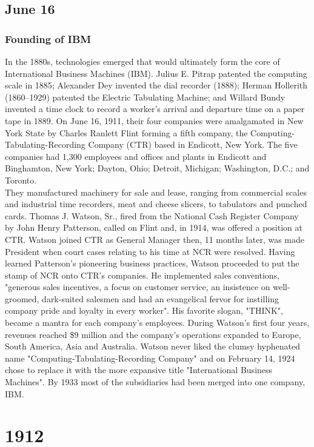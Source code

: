 \documentclass[11pt]{report}
\begin{document}
\section{June 16}
\subsection{Founding of IBM}
In the 1880s, technologies emerged that would ultimately form the core of International Business Machines (IBM). Julius E. Pitrap patented the computing scale in 1885; Alexander Dey invented the dial recorder (1888); Herman Hollerith (1860–1929) patented the Electric Tabulating Machine; and Willard Bundy invented a time clock to record a worker's arrival and departure time on a paper tape in 1889. On June 16, 1911, their four companies were amalgamated in New York State by Charles Ranlett Flint forming a fifth company, the Computing-Tabulating-Recording Company (CTR) based in Endicott, New York. The five companies had 1,300 employees and offices and plants in Endicott and Binghamton, New York; Dayton, Ohio; Detroit, Michigan; Washington, D.C.; and Toronto.\\ \indent They manufactured machinery for sale and lease, ranging from commercial scales and industrial time recorders, meat and cheese slicers, to tabulators and punched cards. Thomas J. Watson, Sr., fired from the National Cash Register Company by John Henry Patterson, called on Flint and, in 1914, was offered a position at CTR. Watson joined CTR as General Manager then, 11 months later, was made President when court cases relating to his time at NCR were resolved. Having learned Patterson's pioneering business practices, Watson proceeded to put the stamp of NCR onto CTR's companies. He implemented sales conventions, "generous sales incentives, a focus on customer service, an insistence on well-groomed, dark-suited salesmen and had an evangelical fervor for instilling company pride and loyalty in every worker". His favorite slogan, "THINK", became a mantra for each company's employees. During Watson's first four years, revenues reached \$9 million and the company's operations expanded to Europe, South America, Asia and Australia. Watson never liked the clumsy hyphenated name "Computing-Tabulating-Recording Company" and on February 14, 1924 chose to replace it with the more expansive title "International Business Machines". By 1933 most of the subsidiaries had been merged into one company, IBM.

\chapter{1912}
\end{document}
